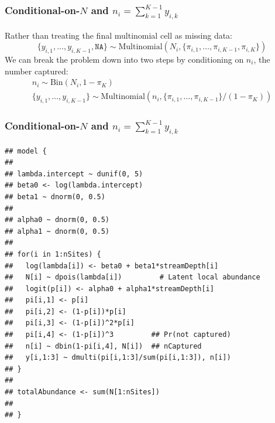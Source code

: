 \documentclass[color=usenames,dvipsnames]{beamer}\usepackage[]{graphicx}\usepackage[]{color}
\makeatletter
\newenvironment{kframe}{%
 \def\at@end@of@kframe{}%
 \ifinner\ifhmode%
  \def\at@end@of@kframe{\end{minipage}}%
  \begin{minipage}{\columnwidth}%
 \fi\fi%
 \def\FrameCommand##1{\hskip\@totalleftmargin \hskip-\fboxsep
 \colorbox{shadecolor}{##1}\hskip-\fboxsep
     \hskip-\linewidth \hskip-\@totalleftmargin \hskip\columnwidth}%
 \MakeFramed {\advance\hsize-\width
   \@totalleftmargin\z@ \linewidth\hsize
   \@setminipage}}%
 {\par\unskip\endMakeFramed%
 \at@end@of@kframe}
\newenvironment{knitrout}{}{} %
\makeatother
\begin{document}
\begin{frame}[fragile]
  \frametitle{\normalsize Conditional-on-$N$ and $n_i=\sum_{k=1}^{K-1} y_{i,k}$}
  Rather than treating the final multinomial cell as missing data:
  \[
    \{y_{i,1}, \dots, y_{i,K-1}, \mathtt{NA}\} \sim
    \mathrm{Multinomial}(N_i, \{\pi_{i,1}, \dots, \pi_{i,K-1}, \pi_{i,K}\})
  \]
  \pause
  \vfill
  We can break the problem down into two steps by conditioning on
  $n_i$, the number captured:
  \small
  \begin{gather*}
    n_i \sim \mathrm{Bin}(N_i, 1-\pi_K) \\
    \{y_{i,1}, \dots, y_{i,K-1}\} \sim \mathrm{Multinomial}(n_i,
    \{\pi_{i,1}, \dots, \pi_{i,K-1}\}/(1-\pi_K))
  \end{gather*}
\end{frame}



\begin{frame}[fragile]
  \frametitle{\normalsize Conditional-on-$N$ and $n_i=\sum_{k=1}^{K-1} y_{i,k}$}
\begin{knitrout}\scriptsize
{}\color{fgcolor}\begin{kframe}
\begin{verbatim}
## model {
## 
## lambda.intercept ~ dunif(0, 5)
## beta0 <- log(lambda.intercept)
## beta1 ~ dnorm(0, 0.5)
## 
## alpha0 ~ dnorm(0, 0.5)  
## alpha1 ~ dnorm(0, 0.5)
## 
## for(i in 1:nSites) {
##   log(lambda[i]) <- beta0 + beta1*streamDepth[i]
##   N[i] ~ dpois(lambda[i])         # Latent local abundance
##   logit(p[i]) <- alpha0 + alpha1*streamDepth[i]
##   pi[i,1] <- p[i]
##   pi[i,2] <- (1-p[i])*p[i]
##   pi[i,3] <- (1-p[i])^2*p[i]
##   pi[i,4] <- (1-p[i])^3         ## Pr(not captured)
##   n[i] ~ dbin(1-pi[i,4], N[i])  ## nCaptured
##   y[i,1:3] ~ dmulti(pi[i,1:3]/sum(pi[i,1:3]), n[i])
## }
## 
## totalAbundance <- sum(N[1:nSites])
## 
## }
\end{verbatim}
\end{kframe}
\end{knitrout}
\end{frame}
\end{document}
